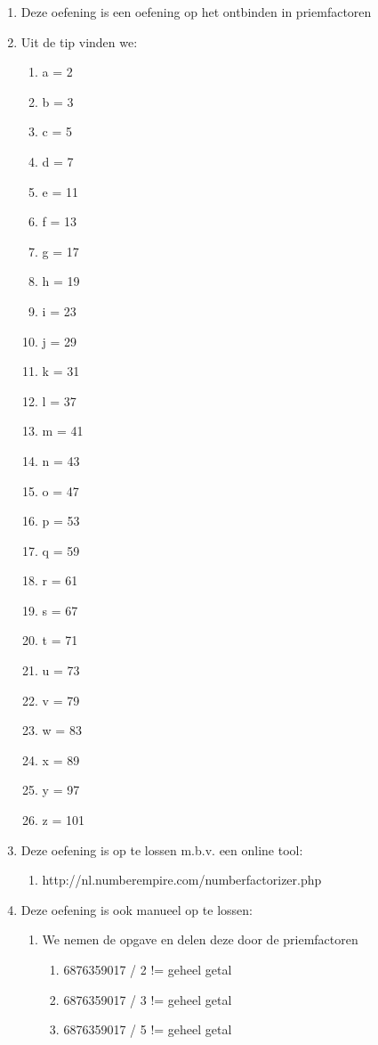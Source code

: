 \begin{enumerate}
  \item Deze oefening is een oefening op het ontbinden in priemfactoren
  \item Uit de tip vinden we:
  \begin{enumerate}
  \item a = 2
  \item b = 3
  \item c = 5
  \item d = 7
  \item e = 11
  \item f = 13
  \item g = 17
  \item h = 19
  \item i = 23
  \item j = 29
  \item k = 31
  \item l = 37
  \item m = 41
  \item n = 43
  \item o = 47
  \item p = 53
  \item q = 59
  \item r = 61
  \item s = 67
  \item t = 71
  \item u = 73
  \item v = 79
  \item w = 83
  \item x = 89
  \item y = 97
  \item z = 101
  \end{enumerate}
  \item Deze oefening is op te lossen m.b.v. een online tool:
  \begin{enumerate}
  \item http://nl.numberempire.com/numberfactorizer.php
  \end{enumerate}
  \item Deze oefening is ook manueel op te lossen:
  \begin{enumerate}
  \item We nemen de opgave en delen deze door de priemfactoren
  \begin{enumerate}
  \item 6876359017 / 2 != geheel getal
  \item 6876359017 / 3 != geheel getal
  \item 6876359017 / 5 != geheel getal

\end{enumerate}
\end{enumerate}
\end{enumerate}
